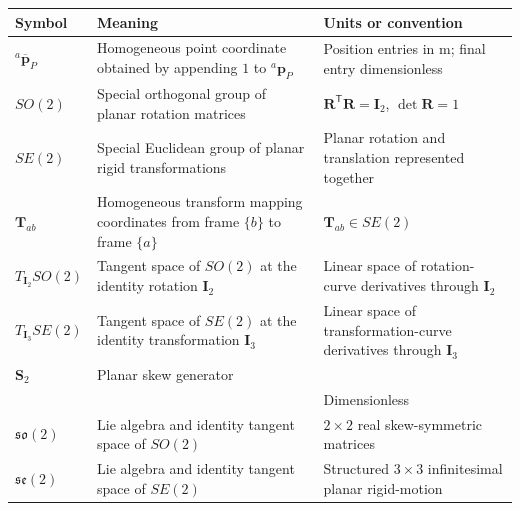 \documentclass[
  australian,
  12pt,
  letterpaper,
  DIV=11,
  numbers=noendperiod,
  twoside]{scrreprt}
\newcounter{none} %
\begin{document}
{\def\LTcaptype{none} %
\begin{longtable}[]{@{}
  >{\raggedright\arraybackslash}p{}
  >{\raggedright\arraybackslash}p{}
  >{\raggedright\arraybackslash}p{}@{}}
\toprule\noalign{}
\begin{minipage}[b]{\linewidth}\raggedright
Symbol
\end{minipage} & \begin{minipage}[b]{\linewidth}\raggedright
Meaning
\end{minipage} & \begin{minipage}[b]{\linewidth}\raggedright
Units or convention
\end{minipage} \\
\midrule\noalign{}
\endhead
\bottomrule\noalign{}
\endlastfoot
\({}^{a}\overline{\mathbf p}_P\) & Homogeneous point coordinate obtained
by appending \(1\) to \({}^{a}\mathbf p_P\) & Position entries in
\(\mathrm m\); final entry dimensionless \\
\(SO(2)\) & Special orthogonal group of planar rotation matrices &
\(\mathbf R^\mathsf T\mathbf R=\mathbf I_2\), \(\det\mathbf R=1\) \\
\(SE(2)\) & Special Euclidean group of planar rigid transformations &
Planar rotation and translation represented together \\
\(\mathbf{T}_{ab}\) & Homogeneous transform mapping coordinates from
frame \(\{b\}\) to frame \(\{a\}\) & \(\mathbf{T}_{ab}\in SE(2)\) \\
\(T_{\mathbf I_2}SO(2)\) & Tangent space of \(SO(2)\) at the identity
rotation \(\mathbf I_2\) & Linear space of rotation-curve derivatives
through \(\mathbf I_2\) \\
\(T_{\mathbf I_3}SE(2)\) & Tangent space of \(SE(2)\) at the identity
transformation \(\mathbf I_3\) & Linear space of transformation-curve
derivatives through \(\mathbf I_3\) \\
\(\mathbf S_2\) & Planar skew generator
\(\begin{bmatrix}0&-1\\1&0\end{bmatrix}\) & Dimensionless \\
\(\mathfrak{so}(2)\) & Lie algebra and identity tangent space of
\(SO(2)\) & \(2\times2\) real skew-symmetric matrices \\
\(\mathfrak{se}(2)\) & Lie algebra and identity tangent space of
\(SE(2)\) & Structured \(3\times3\) infinitesimal planar rigid-motion

\end{longtable}}
\end{document}
